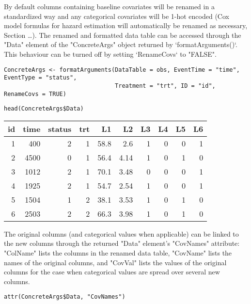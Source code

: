 \documentclass{report}
\newcommand{\1}{\ensuremath{\mathbf{1}}}
\begin{document}
By default columns containing baseline covariates will be renamed in a standardized way and any categorical covariates will be 1-hot encoded (Cox model formulas for hazard estimation will automatically be renamed as necessary, Section \ldots{}). The renamed and formatted data table can be accessed through the "Data" element of the "ConcreteArgs" object returned by `formatArguments()`. This behaviour can be turned off by setting `RenameCovs` to "FALSE".

\begin{lstlisting}
ConcreteArgs <- formatArguments(DataTable = obs, EventTime = "time", EventType = "status", 
                                Treatment = "trt", ID = "id", RenameCovs = TRUE)
\end{lstlisting}

\begin{lstlisting}
head(ConcreteArgs$Data)
\end{lstlisting}

\begin{center}
\begin{tabular}{rrrrrrrrrr}
id & time & status & trt & L1 & L2 & L3 & L4 & L5 & L6\\
\hline
1 & 400 & 2 & 1 & 58.8 & 2.6 & 1 & 0 & 0 & 1\\
2 & 4500 & 0 & 1 & 56.4 & 4.14 & 1 & 0 & 1 & 0\\
3 & 1012 & 2 & 1 & 70.1 & 3.48 & 0 & 0 & 0 & 1\\
4 & 1925 & 2 & 1 & 54.7 & 2.54 & 1 & 0 & 0 & 1\\
5 & 1504 & 1 & 2 & 38.1 & 3.53 & 1 & 0 & 1 & 0\\
6 & 2503 & 2 & 2 & 66.3 & 3.98 & 1 & 0 & 1 & 0\\
\end{tabular}
\end{center}

The original columns (and categorical values when applicable) can be linked to the new columns through the returned "Data" element's "CovNames" attribute: "ColName" lists the columns in the renamed data table, "CovName" lists the names of the original columns, and "CovVal" lists the values of the original columns for the case when categorical values are spread over several new columns.   

\begin{lstlisting}
attr(ConcreteArgs$Data, "CovNames")
\end{lstlisting}
\end{document}

